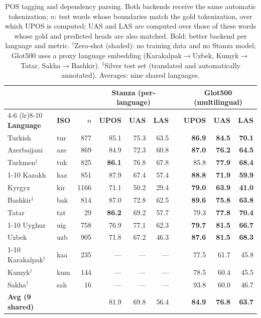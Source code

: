 \begin{table}[t]
  \centering
  \footnotesize
  \setlength{\tabcolsep}{4pt}
  \begin{tabular}{@{}ll r  rrr r  rrr@{}}
    \toprule
    & & & \multicolumn{3}{c}{\textbf{Stanza (per-language)}} & & \multicolumn{3}{c}{\textbf{Glot500 (multilingual)}} \\
    \cmidrule(lr){4-6} \cmidrule(lr){8-10}
    \textbf{Language} & \textbf{ISO} & $n$ &
    \textbf{UPOS} & \textbf{UAS} & \textbf{LAS} & &
    \textbf{UPOS} & \textbf{UAS} & \textbf{LAS} \\
    \midrule
    Turkish        & tur & 877  & 85.1 & 75.3 & 63.5 & & \textbf{86.9} & \textbf{84.5} & \textbf{70.1} \\
    Azerbaijani    & aze & 869  & 84.9 & 72.3 & 60.8 & & \textbf{87.0} & \textbf{76.2} & \textbf{64.5} \\
    Turkmen$^\ddagger$ & tuk & 825  & \textbf{86.1} & 76.8 & 67.8 & & 85.8 & \textbf{77.9} & \textbf{68.4} \\
    \cmidrule(lr){1-10}
    Kazakh         & kaz & 851  & 87.9 & 67.4 & 57.4 & & \textbf{88.8} & \textbf{71.9} & \textbf{59.9} \\
    Kyrgyz         & kir & 1166 & 71.1 & 50.2 & 29.4 & & \textbf{79.0} & \textbf{63.9} & \textbf{41.0} \\
    Bashkir$^\ddagger$ & bak & 814  & 87.0 & 72.8 & 62.5 & & \textbf{89.6} & \textbf{75.8} & \textbf{63.8} \\
    Tatar          & tat &  29  & \textbf{86.2} & 69.2 & 57.7 & & 79.3 & \textbf{77.8} & \textbf{70.4} \\
    \cmidrule(lr){1-10}
    Uyghur         & uig & 758  & 76.9 & 77.1 & 62.3 & & \textbf{79.7} & \textbf{81.5} & \textbf{66.7} \\
    Uzbek          & uzb & 905  & 71.8 & 67.2 & 46.3 & & \textbf{87.6} & \textbf{81.5} & \textbf{68.3} \\
    \cmidrule(lr){1-10}
    \rowcolor{codebg}
    Karakalpak$^\dagger$     & kaa &  235 & --- & --- & --- & & 77.5 & 61.7 & 45.8 \\
    \rowcolor{codebg}
    Kumyk$^\dagger$          & kum & 144  & --- & --- & --- & & 78.5 & 60.4 & 45.5 \\
    \rowcolor{codebg}
    Sakha$^\dagger$          & sah &  16  & --- & --- & --- & & 93.8 & 60.0 & 46.7 \\
    \midrule
    \textbf{Avg (9 shared)} & & & 81.9 & 69.8 & 56.4 & & \textbf{84.9} & \textbf{76.8} & \textbf{63.7} \\
    \bottomrule
  \end{tabular}
  \caption{POS tagging and dependency parsing. Both backends receive the same automatic tokenization; $n$: test words whose boundaries match the gold tokenization, over which UPOS is computed; UAS and LAS are computed over those of these words whose gold and predicted heads are also matched. Bold: better backend per language and metric. $^\dagger$Zero-shot (shaded): no training data and no Stanza model; Glot500 uses a proxy language embedding (Karakalpak$\to$Uzbek, Kumyk$\to$Tatar, Sakha$\to$Bashkir). $^\ddagger$Silver test set (translated and automatically annotated). Averages: nine shared languages.}
  \label{tab:parsing-eval}
\end{table}
